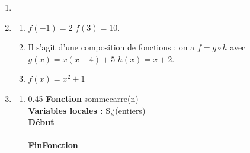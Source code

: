 \begin{enumerate}[label=\thechapter.\arabic*., font=\bfseries, itemsep=10mm,labelsep*=3mm,left=0mm]
\begin{enumerate}[label=\alph*)]
\item \begin{minipage}[t][][b]{1\textwidth}
\end{minipage}
\end{enumerate}



\item \begin{minipage}[t][][b]{1\textwidth}
\end{minipage}



\item
\begin{enumerate}[label=\alph*),itemsep=2mm]
\item $f(-1)=2$  $f(3)=10$.


\item Il s'agit d'une composition de fonctions : on a\; $f=g\circ h$ \hspace{2mm}avec\hspace{2mm} $g(x)=x(x-4)+5$  $h(x)=x+2$.

\item $f(x)=x^2+1$

\end{enumerate}



\item \begin{enumerate}[label=\alph*),itemsep=3mm]
\item \begin{minipage}[t][][b]{1\textwidth}
\begin{affichagealgorithme}{0.45}
\textbf{Fonction} sommecarre(n)\\
\textbf{Variables locales :} S\;,\;j\;(entiers)\\
\textbf{Début}\\
\\
\textbf{FinFonction}
\end{affichagealgorithme}
\end{minipage}


\end{enumerate}
\end{enumerate}
